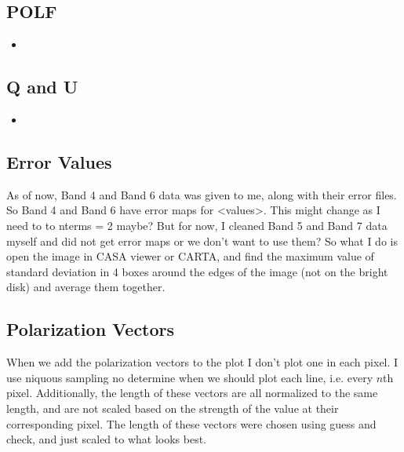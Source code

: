 \subsection{POLF}
\begin{itemize}
    \item {} \cite{Kataoka_2017}
\end{itemize}

\subsection{Q and U}
\begin{itemize}
    \item {} \cite{Kataoka_2017} 
\end{itemize}

\subsection{Error Values}
As of now, Band 4 and Band 6 data was given to me, along with their error files. So Band 4 and Band 6 have error maps for <values>. This might change as I need to to nterms = 2 maybe? But for now, I cleaned Band 5 and Band 7 data myself and did not get error maps or we don't want to use them? So what I do is open the image in CASA viewer or CARTA, and find the maximum value of standard deviation in 4 boxes around the edges of the image (not on the bright disk) and average them together. 

\subsection{Polarization Vectors}
When we add the polarization vectors to the plot I don't plot one in each pixel. I use niquous  sampling no determine when we should plot each line, i.e. every $n$th pixel. Additionally, the length of these vectors are all normalized to the same length, and are not scaled based on the strength of the value at their corresponding pixel. The length of these vectors were chosen using guess and check, and just scaled to what looks best. 


